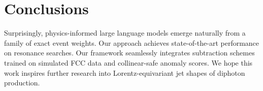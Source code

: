 \section{Conclusions}\label{sec:conclusions}

Surprisingly, physics-informed large language models emerge naturally
from a family of exact event weights. Our approach achieves
state-of-the-art performance on resonance searches. Our framework
seamlessly integrates subtraction schemes trained on simulated FCC data
and collinear-safe anomaly scores. We hope this work inspires further
research into Lorentz-equivariant jet shapes of diphoton production.

